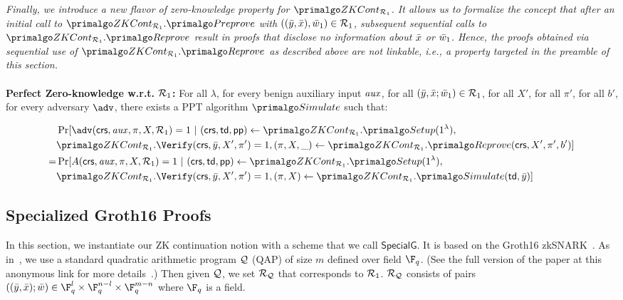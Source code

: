 \begin{definition}[ZK Continuation]
 \emph{Finally, we introduce a new flavor of zero-knowledge property for $ \ZKCont_{\relone} $. It allows us to formalize the concept that after an initial call to $\ZKCont_{\relone}.\Preprove$ with $((\bar{y}, \bar{x}), \bar{w}_1) \in \mathcal{R}_1$, subsequent sequential calls to $ \ZKCont_{\relone}.\Reprove $ result in proofs that disclose no information about $\bar{x}$ or $\bar{w}_1$.
Hence, the proofs obtained via sequential use of $ \ZKCont_{\relone}.\Reprove $ as described above are not linkable, i.e., a property targeted  in the preamble of this section. }
\\\\
\noindent \textbf{Perfect Zero-knowledge w.r.t. $\mathcal{R}_1$:} For all $\lambda$, for every benign auxiliary input $\mathit{aux}$, 
for all  $(\bar{y}, \bar{x}; \bar{w}_1) \in \mathcal{R}_1$, for all $X'$, for all $\pi'$, for all $b'$, for every adversary $\adv$, there exists a PPT algorithm $ \Sim $ such that:
\begin{footnotesize}
\begin{align*}
& \Pr [\adv(\crs, \realaux, \pi, X, \relone) = 1 \ | \ (\crs, \tw, \pp) \leftarrow \ZKCont_{\relone}.\Setup (1^{\lambda}), 
\\& \ZKCont_{\relone}.\Verify(\crs, \bary, X', \pi') = 1,  (\pi, X, \_) \leftarrow \ZKCont_{\relone}.\Reprove (\crs, X', \pi', b')] \\
= & \Pr[A(\crs, \realaux, \pi, X, \relone) = 1 \ | \ (\crs, \tw, \pp) \leftarrow \ZKCont_{\relone}.\Setup (1^{\lambda}), \\ 
                        & \ZKCont_{\relone}.\Verify(\crs, \bary, X', \pi') = 1,  (\pi, X) \leftarrow \ZKCont_{\relone}.\Sim(\tw, \bary)]
\end{align*}

\end{footnotesize}


\end{definition} 



\subsection{Specialized Groth16 Proofs}
\label{sec:rvrf_groth16}

In this section, we instantiate our ZK continuation notion with a scheme that we call  \emph{$\mathsf{SpecialG}$}. It is based on the Groth16 zkSNARK~\cite{Groth16}.
As in~\cite{Groth16}, we use a standard quadratic arithmetic program $ \mathcal{Q} $ (QAP) of size $ m $ defined over field $ \F_q $. 
(See the full version of the paper at this anonymous link for more details~\cite{anonymous}.)
Then given $ \mathcal{Q} $, we set  $ \mathcal{R}_{\mathcal{Q}}  $ that corresponds to $ \mathcal{R}_1 $. $ \mathcal{R}_{\mathcal{Q}} $  consists of pairs $((\bary, \barx); \baromega) \in \F_q^{l} \times \F_q^{n-l} \times \F_q^{m-n}$ where $\F_q$ is a field.  

